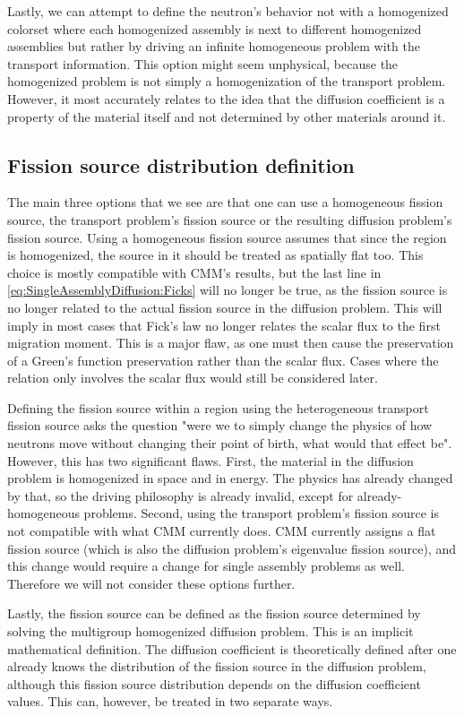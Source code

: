 \documentclass[a4paper,letterpaper,12pt,oneside,draft]{article}
\begin{document}
Lastly, we can attempt to define the neutron's behavior not with a homogenized colorset where each homogenized assembly is next to different homogenized assemblies but rather by driving an infinite homogeneous problem with the transport information.
This option might seem unphysical, because the homogenized problem is not simply a homogenization of the transport problem. 
However, it most accurately relates to the idea that the diffusion coefficient is a property of the material itself and not determined by other materials around it.

\subsection{Fission source distribution definition}
The main three options that we see are that one can use a homogeneous fission source, the transport problem's fission source or the resulting diffusion problem's fission source. 
Using a homogeneous fission source assumes that since the region is homogenized, the source in it should be treated as spatially flat too.
This choice is mostly compatible with CMM's results, but the last line in \cref{eq:SingleAssemblyDiffusion:Ficks} will no longer be true, as the fission source is no longer related to the actual fission source in the diffusion problem.
This will imply in most cases that Fick's law no longer relates the scalar flux to the first migration moment.
This is a major flaw, as one must then cause the preservation of a Green's function preservation rather than the scalar flux.
Cases where the relation only involves the scalar flux would still be considered later.

Defining the fission source within a region using the heterogeneous transport fission source asks the question "were we to simply change the physics of how neutrons move without changing their point of birth, what would that effect be".
However, this has two significant flaws.
First, the material in the diffusion problem is homogenized in space and in energy.
The physics has already changed by that, so the driving philosophy is already invalid, except for already-homogeneous problems.
Second, using the transport problem's fission source is not compatible with what CMM currently does.
CMM currently assigns a flat fission source (which is also the diffusion problem's eigenvalue fission source), and this change would require a change for single assembly problems as well.
Therefore we will not consider these options further.

Lastly, the fission source can be defined as the fission source determined by solving the multigroup homogenized diffusion problem.
This is an implicit mathematical definition.
The diffusion coefficient is theoretically defined after one already knows the distribution of the fission source in the diffusion problem, although this fission source distribution depends on the diffusion coefficient values.
This can, however, be treated in two separate ways.
\end{document}
